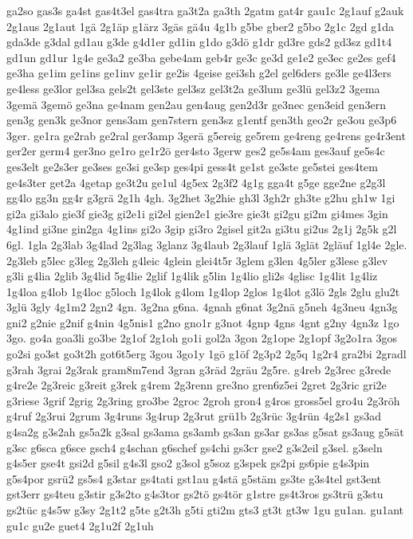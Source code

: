 {ga2so
gas3s
ga4st
gas4t3el
gas4tra
ga3t2a
ga3th
2gatm
gat4r
gau1c
2g1auf
g2auk
2g1aus
2g1aut
1gä
2g1äp
g1ärz
3gäs
gä4u
4g1b
g5be
gber2
g5bo
2g1c
2gd
g1da
gda3de
g3dal
gd1au
g3de
g4d1er
gd1in
g1do
g3dö
g1dr
gd3re
gds2
gd3sz
gd1t4
gd1un
gd1ur
1g4e
ge3a2
ge3ba
gebe4am
geb4r
ge3c
ge3d
ge1e2
ge3ec
ge2es
gef4
ge3ha
ge1im
ge1ins
ge1inv
ge1ir
ge2is
4geise
gei3sh
g2el
gel6ders
ge3le
ge4l3ers
ge4less
ge3lor
gel3sa
gels2t
gel3ste
gel3sz
gel3t2a
ge3lum
ge3lü
gel3z2
3gema
3gemä
3gemö
ge3na
ge4nam
gen2au
gen4aug
gen2d3r
ge3nec
gen3eid
gen3ern
gen3g
gen3k
ge3nor
gens3am
gen7stern
gen3sz
g1entf
gen3th
geo2r
ge3ou
ge3p6
3ger.
ge1ra
ge2rab
ge2ral
ger3amp
3gerä
g5ereig
ge5rem
ge4reng
ge4rens
ge4r3ent
ger2er
germ4
ger3no
ge1ro
ge1r2ö
ger4sto
3gerw
ges2
ge5s4am
ges3auf
ge5s4c
ges3elt
ge2s3er
ge3ses
ge3si
ge3sp
ges4pi
gess4t
ge1st
ge3ste
ge5stei
ges4tem
ge4s3ter
get2a
4getap
ge3t2u
ge1ul
4g5ex
2g3f2
4g1g
gga4t
g5ge
gge2ne
g2g3l
gg4lo
gg3n
gg4r
g3grä
2g1h
4gh.
3g2het
3g2hie
gh3l
3gh2r
gh3te
g2hu
gh1w
1gi
gi2a
gi3alo
gie3f
gie3g
gi2e1i
gi2el
gien2e1
gie3re
gie3t
gi2gu
gi2m
gi4mes
3gin
4g1ind
gi3ne
gin2ga
4g1ins
gi2o
3gip
gi3ro
2gisel
git2a
gi3tu
gi2us
2g1j
2g5k
g2l
6gl.
1gla
2g3lab
3g4lad
2g3lag
3glanz
3g4laub
2g3lauf
1glä
3glät
2gläuf
1gl4e
2gle.
2g3leb
g5lec
g3leg
2g3leh
g4leic
4glein
glei4t5r
3glem
g3len
4g5ler
g3lese
g3lev
g3li
g4lia
2glib
3g4lid
5g4lie
2glif
1g4lik
g5lin
1g4lio
gli2s
4glisc
1g4lit
1g4liz
1g4loa
g4lob
1g4loc
g5loch
1g4lok
g4lom
1g4lop
2glos
1g4lot
g3lö
2gls
2glu
glu2t
3glü
3gly
4g1m2
2gn2
4gn.
3g2na
g6na.
4gnah
g6nat
3g2nä
g5neh
4g3neu
4gn3g
gni2
g2nie
g2nif
g4nin
4g5nis1
g2no
gno1r
g3not
4gnp
4gns
4gnt
g2ny
4gn3z
1go
3go.
go4a
goa3li
go3be
2g1of
2g1oh
go1i
gol2a
3gon
2g1ope
2g1opf
3g2o1ra
3gos
go2si
go3st
go3t2h
got6t5erg
3gou
3go1y
1gö
g1öf
2g3p2
2g5q
1g2r4
gra2bi
2gradl
g3rah
3grai
2g3rak
gram8m7end
3gran
g3räd
2gräu
2g5re.
g4reb
2g3rec
g3rede
g4re2e
2g3reic
g3reit
g3rek
g4rem
2g3renn
gre3no
gren6z5ei
2gret
2g3ric
gri2e
g3riese
3grif
2grig
2g3ring
gro3be
2groc
2groh
gron4
g4ros
gross5el
gro4u
2g3röh
g4ruf
2g3rui
2grum
3g4runs
3g4rup
2g3rut
grü1b
2g3rüc
3g4rün
4g2s1
gs3ad
g4sa2g
g3s2ah
gs5a2k
g3sal
gs3ama
gs3amb
gs3an
gs3ar
gs3as
g5sat
gs3aug
g5sät
g3sc
g6sca
g6sce
gsch4
g4schan
g6schef
gs4chi
gs3cr
gse2
g3s2eil
g3sel.
g3seln
g4s5er
gse4t
gsi2d
g5sil
g4s3l
gso2
g3sol
g5soz
g3spek
gs2pi
gs6pie
g4s3pin
g5s4por
gsrü2
gs5s4
g3star
gs4tati
gst1au
g4stä
g5stäm
gs3te
g3s4tel
gst3ent
gst3err
gs4teu
g3stir
g3s2to
g4s3tor
gs2tö
gs4tör
g1stre
gs4t3ros
gs3trü
g3stu
gs2tüc
g4s5w
g3sy
2g1t2
g5te
g2t3h
g5ti
gti2m
gts3
gt3t
gt3w
1gu
gu1an.
gu1ant
gu1c
gu2e
guet4
2g1u2f
2g1uh
}
